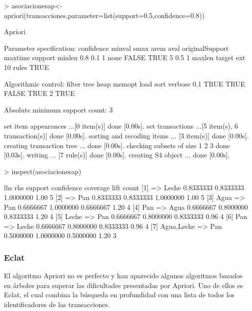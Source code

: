 \documentclass [a4paper] {article}
\begin{document}
\begin{Schunk}
\begin{Sinput}
> asociacionesap<-apriori(transacciones,parameter=list(support=0.5,confidence=0.8))
\end{Sinput}
\begin{Soutput}
Apriori

Parameter specification:
 confidence minval smax arem  aval originalSupport maxtime support minlen
        0.8    0.1    1 none FALSE            TRUE       5     0.5      1
 maxlen target  ext
     10  rules TRUE

Algorithmic control:
 filter tree heap memopt load sort verbose
    0.1 TRUE TRUE  FALSE TRUE    2    TRUE

Absolute minimum support count: 3 

set item appearances ...[0 item(s)] done [0.00s].
set transactions ...[5 item(s), 6 transaction(s)] done [0.00s].
sorting and recoding items ... [3 item(s)] done [0.00s].
creating transaction tree ... done [0.00s].
checking subsets of size 1 2 3 done [0.03s].
writing ... [7 rule(s)] done [0.00s].
creating S4 object  ... done [0.00s].
\end{Soutput}
\begin{Sinput}
> inspect(asociacionesap)
\end{Sinput}
\begin{Soutput}
    lhs             rhs     support   confidence coverage  lift count
[1] {}           => {Leche} 0.8333333 0.8333333  1.0000000 1.00 5    
[2] {}           => {Pan}   0.8333333 0.8333333  1.0000000 1.00 5    
[3] {Agua}       => {Pan}   0.6666667 1.0000000  0.6666667 1.20 4    
[4] {Pan}        => {Agua}  0.6666667 0.8000000  0.8333333 1.20 4    
[5] {Leche}      => {Pan}   0.6666667 0.8000000  0.8333333 0.96 4    
[6] {Pan}        => {Leche} 0.6666667 0.8000000  0.8333333 0.96 4    
[7] {Agua,Leche} => {Pan}   0.5000000 1.0000000  0.5000000 1.20 3    
\end{Soutput}
\end{Schunk}

\subsubsection{Eclat}
El algoritmo Apriori no es perfecto y han aparecido algunos algoritmos basados en
árboles para superar las dificultades presentadas por Apriori. Uno de ellos es Eclat, el cual combina la búsqueda en profundidad con una lista de todos los
identificadores de las transacciones.
\end{document}
